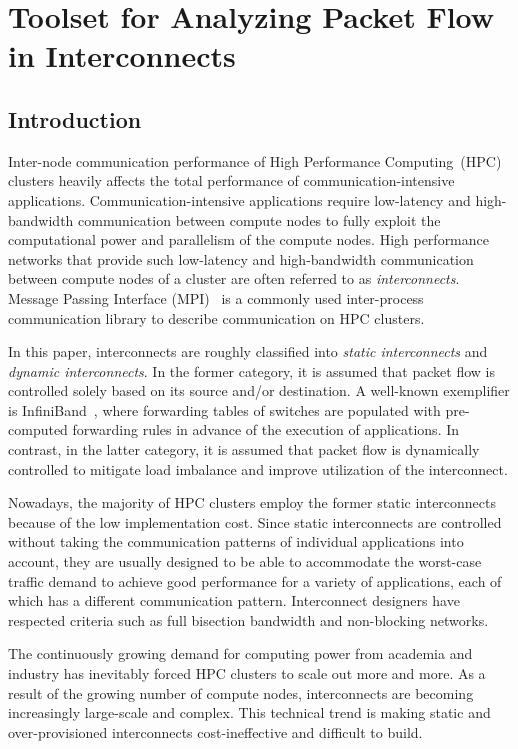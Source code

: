 \chapter{Toolset for Analyzing Packet Flow in Interconnects}\label{sec:ii}

\section{Introduction}\label{sec:ii-introduction}

Inter-node communication performance of High Performance Computing~(HPC)
clusters heavily affects the total performance of
communication-intensive applications. Communication-intensive
applications require low-latency and high-bandwidth communication
between compute nodes to fully exploit the computational power and
parallelism of the compute nodes. High performance networks that
provide such low-latency and high-bandwidth communication between
compute nodes of a cluster are often referred to as
\emph{interconnects}. Message Passing Interface
(MPI)~\autocites{MessagePassingInterfaceForum2015}{Gropp2014} is a
commonly used inter-process communication library to describe
communication on HPC clusters.

In this paper, interconnects are roughly classified into \emph{static
interconnects} and \emph{dynamic interconnects}. In the former category,
it is assumed that packet flow is controlled solely based on its source
and/or destination. A well-known exemplifier is
InfiniBand~\autocite{Buyya2009}, where forwarding tables of
switches are populated with pre-computed forwarding rules in advance of
the execution of applications. In contrast, in the latter category, it
is assumed that packet flow is dynamically controlled to mitigate load
imbalance and improve utilization of the interconnect.

Nowadays, the majority of HPC clusters employ the former static
interconnects because of the low implementation cost. Since static
interconnects are controlled without taking the communication patterns
of individual applications into account, they are usually designed to be
able to accommodate the worst-case traffic demand to achieve good
performance for a variety of applications, each of which has a different
communication pattern. Interconnect designers have respected criteria
such as full bisection bandwidth and non-blocking networks.

The continuously growing demand for computing power from academia and
industry has inevitably forced HPC clusters to scale out more and more.
As a result of the growing number of compute nodes, interconnects are
becoming increasingly large-scale and complex. This technical trend is
making static and over-provisioned interconnects cost-ineffective and
difficult to build.

